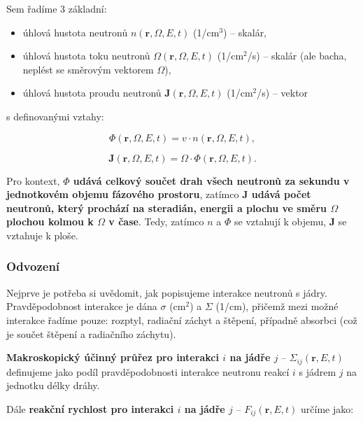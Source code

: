 Sem řadíme 3 základní:

\begin{itemize}
  \item úhlová hustota neutronů $n(\textbf{r}, \Omega, E, t)$ (1/cm$^3$) -- skalár,
  \item úhlová hustota toku neutronů $\Omega(\textbf{r}, \Omega, E, t)$ (1/cm$^2$/s) -- skalár (ale bacha, neplést se směrovým vektorem $\Omega$),
  \item úhlová hustota proudu neutronů $\textbf{J}(\textbf{r}, \Omega, E, t)$ (1/cm$^2$/s) -- vektor
\end{itemize}

s definovanými vztahy:

\begin{equation}
  \boxed{
  \Phi(\textbf{r}, \Omega, E, t) = v \cdot n(\textbf{r}, \Omega, E, t),
  \label{definice_hustota_toku}}
\end{equation}

\begin{equation}
  \boxed{
  \textbf{J}(\textbf{r}, \Omega, E, t) = \Omega \cdot \Phi(\textbf{r}, \Omega, E, t).
  \label{definice_hustota_proudu}}
\end{equation}

Pro kontext, \textbf{$\Phi$ udává celkový součet drah všech neutronů za sekundu v jednotkovém objemu fázového prostoru}, zatímco \textbf{$\textbf{J}$ udává počet neutronů, který prochází na steradián, energii a plochu ve směru $\Omega$ plochou kolmou k $\Omega$ v čase}. Tedy, zatímco $n$ a $\Phi$ se vztahují k objemu, $\textbf{J}$ se vztahuje k ploše.

\subsubsection{Odvození}

Nejprve je potřeba si uvědomit, jak popisujeme interakce neutronů s jádry. Pravděpodobnost interakce je dána $\sigma$ (cm$^2$) a $\Sigma$ (1/cm), přičemž mezi možné interakce řadíme pouze: rozptyl, radiační záchyt a štěpení, případně absorbci (což je součet štěpení a radiačního záchytu).

\textbf{Makroskopický účinný průřez pro interakci $i$ na jádře $j$} -- $\Sigma_{ij}(\textbf{r}, E, t)$ definujeme jako podíl pravděpodobnosti interakce neutronu reakcí $i$ s jádrem $j$ na jednotku délky dráhy.

Dále \textbf{reakční rychlost pro interakci $i$ na jádře $j$} -- $F_{ij}(\textbf{r}, E, t)$ určíme jako:

